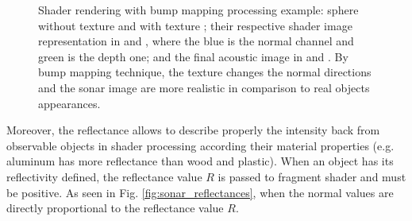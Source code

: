 \documentclass[final,5p,times]{elsarticle}
\begin{document}
\begin{figure}[!h]
{        \label{fig:bump_5}
    }
    \captionsetup{justification=centering}
    \caption{Shader rendering with bump mapping processing example: sphere without texture  and with texture ; their respective shader image representation in  and , where the blue is the normal channel and green is the depth one; and the final acoustic image in  and . By bump mapping technique, the texture changes the normal directions and the sonar image are more realistic in comparison to real objects appearances.}
    \label{fig:sonar_bump_mapping}
\end{figure}

Moreover, the reflectance allows to describe properly the intensity back from observable objects in shader processing according their material properties (e.g. aluminum has more reflectance than wood and plastic). When an object has its reflectivity defined, the reflectance value $R$ is passed to fragment shader and must be positive. As seen in Fig. \ref{fig:sonar_reflectances}, when the normal values are directly proportional to the reflectance value $R$.
\end{document}
